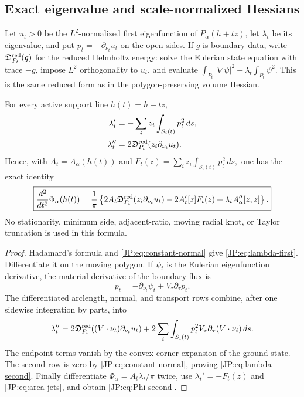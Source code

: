 \subsection{Exact eigenvalue and scale-normalized Hessians}

Let $u_t>0$ be the $L^2$-normalized first eigenfunction of
$P_\alpha(h+tz)$, let $\lambda_t$ be its eigenvalue, and put
$p_t=-\partial_{\nu_t}u_t$ on the open sides.  If $g$ is boundary data,
write $\mathfrak D^{\rm red}_{P_t}(g)$ for the reduced Helmholtz energy: solve the
Eulerian state equation with trace $-g$, impose $L^2$ orthogonality to
$u_t$, and evaluate
\(
 \int_{P_t}|\nabla\psi|^2-\lambda_t\int_{P_t}\psi^2.
\)
This is the same reduced form as in the polygon-preserving volume Hessian.

\begin{theorem}
\label{JP:thm:EH}
For every active support line $h(t)=h+tz$,
\begin{align}
 \lambda_t'&=-\sum_i z_i\int_{S_i(t)}p_t^2\,ds,
 \label{JP:eq:lambda-first}\\
 \lambda_t''&=2\mathfrak D^{\rm red}_{P_t}(z_i\partial_{\nu_t}u_t).
 \label{JP:eq:lambda-second}
\end{align}
Hence, with $A_t=A_\alpha(h(t))$ and
\(
 F_t(z)=\sum_i z_i\int_{S_i(t)}p_t^2\,ds,
\)
one has the exact identity
\begin{equation}\label{JP:eq:Phi-second}
 \boxed{
 \frac{d^2}{dt^2}\Phi_\alpha(h(t))
 =\frac1\pi\left\{
 2A_t\mathfrak D^{\rm red}_{P_t}(z_i\partial_{\nu_t}u_t)
 -2A_t'[z]F_t(z)+\lambda_t A_\alpha''[z,z]
 \right\}.}
\end{equation}
No stationarity, minimum side, adjacent-ratio, moving radial knot, or
Taylor truncation is used in this formula.
\end{theorem}

\begin{proof}
Hadamard's formula and \eqref{JP:eq:constant-normal} give
\eqref{JP:eq:lambda-first}.  Differentiate it on the moving polygon.  If
$\psi_t$ is the Eulerian eigenfunction derivative, the material derivative
of the boundary flux is
\[
 \dot p_t=-\partial_{\nu_t}\psi_t+V_\tau\partial_\tau p_t.
\]
The differentiated arclength, normal, and transport rows combine, after
one sidewise integration by parts, into
\[
 \lambda_t''=2\mathfrak D^{\rm red}_{P_t}((V\cdot\nu_t)\partial_{\nu_t}u_t)
 +2\sum_i\int_{S_i(t)}p_t^2V_\tau
          \partial_\tau(V\cdot\nu_i)\,ds.
\]
The endpoint terms vanish by the convex-corner expansion of the ground
state.  The second row is zero by \eqref{JP:eq:constant-normal}, proving
\eqref{JP:eq:lambda-second}.  Finally differentiate
$\Phi_\alpha=A_t\lambda_t/\pi$ twice, use
$\lambda_t'=-F_t(z)$ and \eqref{JP:eq:area-jets}, and obtain
\eqref{JP:eq:Phi-second}.
\end{proof}

